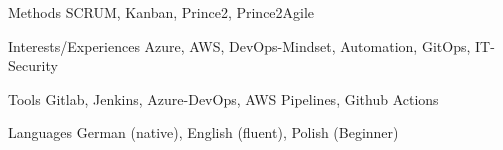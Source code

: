 

\begin{cvskills}

\cvskill
  {Methods} %
  {SCRUM, Kanban, Prince2, Prince2Agile} %

\cvskill
{Interests/Experiences} %
{Azure, AWS, DevOps-Mindset, Automation, GitOps, IT-Security} %

\cvskill
{Tools} %
{Gitlab, Jenkins, Azure-DevOps, AWS Pipelines, Github Actions} %


  \cvskill
    {Languages} %
    {German (native), English (fluent), Polish (Beginner)} %


\end{cvskills}
